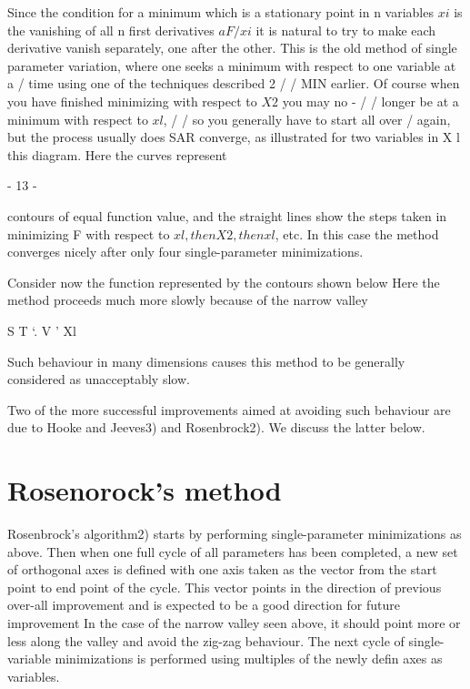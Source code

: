         Since the condition for a minimum which is a stationary point in
   n variables $xi$ is the vanishing of all n first derivatives $aF/xi$
 it is
   natural to try to make each derivative vanish separately, one after the
   other.  This is the old method of single
   parameter variation, where one seeks a
   minimum with respect to one variable at a
       /           time using one of the techniques described
2 / /   MIN earlier.  Of course when you have finished
                                  minimizing with respect to $X2$ you may no
               -  / /            longer be at a minimum with respect to $xl$,
                    / /           so you generally have to start all over
       /                        again, but the process usually does
  SAR                      converge, as illustrated for two variables in
                           X l
                                  this diagram. Here the curves represent
 
                                - 13 -
 
 
contours of equal function value, and the straight lines show the steps
taken in minimizing F with respect to $xl, then X2, then xl$, etc.  In
this case the method converges nicely after only four single-parameter
minimizations.
 
     Consider now the function represented by the contours shown below
Here the method proceeds much more slowly because of the narrow valley
 
                     S T `. V                '
                                              Xl
 
 
 
Such behaviour in many dimensions causes this method to be generally
considered as unacceptably slow.
 
     Two of the more successful improvements aimed at avoiding such
behaviour are due to Hooke and Jeeves3) and Rosenbrock2).  We discuss
the latter below.
 
 
\section{Rosenorock's method}
 
     Rosenbrock's algorithm2) starts by performing single-parameter
minimizations as above.  Then when one full cycle of all parameters has
been completed, a new set of orthogonal axes is defined with one axis
taken as the vector from the start point to end point of the cycle.
This vector points in the direction of previous over-all improvement and
is expected to be a good direction for future improvement  In the case
of the narrow valley seen above, it should point more or less along the
valley and avoid the zig-zag behaviour.  The next cycle of single-variable
 minimizations is performed using multiples of the newly defin
axes as variables.
 
